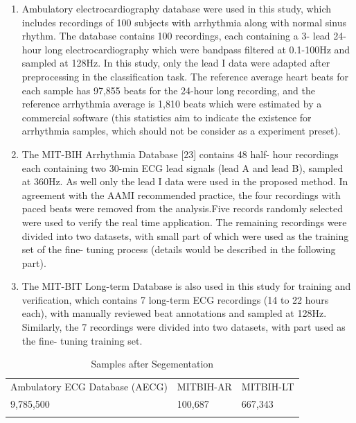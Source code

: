 \documentclass[graybox]{svmult}
\begin{document}
\begin{enumerate}
\item Ambulatory electrocardiography database were used in this study, which includes recordings of 100 subjects with arrhythmia along with normal sinus rhythm. The database contains 100 recordings, each containing a 3- lead 24-hour long electrocardiography which were bandpass filtered at 0.1-100Hz and sampled at 128Hz. In this study, only the lead I data were adapted after preprocessing in the classification task. The reference average heart beats for each sample has 97,855 beats for the 24-hour long recording, and the reference arrhythmia average is 1,810 beats which were estimated by a commercial software (this statistics aim to indicate the existence for arrhythmia samples, which should not be consider as a experiment preset).

\item The MIT-BIH Arrhythmia Database [23] contains 48 half- hour recordings each containing two 30-min ECG lead signals (lead A and lead B), sampled at 360Hz. As well only the lead I data were used in the proposed method. In agreement with the AAMI recommended practice, the four recordings with paced beats were removed from the analysis.Five records randomly selected were used to verify the real time application. The remaining recordings were divided into two datasets, with small part of which were used as the training set of the fine- tuning process (details would be described in the following part).

\item The MIT-BIT Long-term Database is also used in this study for training and verification, which contains 7 long-term ECG recordings (14 to 22 hours each), with manually reviewed beat annotations and sampled at 128Hz. Similarly, the 7 recordings were divided into two datasets, with part used as the fine- tuning training set. 

\end{enumerate}


\begin{table}
\caption{Samples after Segementation}
\label{tab:1}       %
%
%
\begin{tabular}{p{5cm}p{3.2cm}p{3.1cm}}
\hline\noalign{\smallskip}
Ambulatory ECG Database (AECG) & MITBIH-AR & MITBIH-LT   \\
\noalign{\smallskip}\svhline\noalign{\smallskip}
9,785,500 & 100,687  & 667,343 \\
\noalign{\smallskip}\hline\noalign{\smallskip}
\end{tabular}
\end{table}
\end{document}
